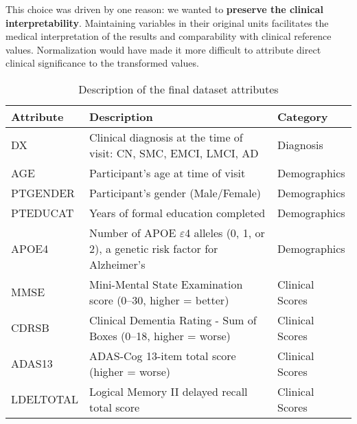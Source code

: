 This choice was driven by one reason: we wanted to \textbf{preserve the clinical interpretability}. Maintaining variables in their original units facilitates the medical interpretation of the results and comparability with clinical reference values. Normalization would have made it more difficult to attribute direct clinical significance to the transformed values.

\newpage

\begin{table}[H]
	\small
	\centering
	\caption{Description of the final dataset attributes}
	\label{tab:dataset-attributes}
	\begin{adjustbox}{max width=\textwidth}
		\begin{tabularx}{\textwidth}{>{\raggedright\arraybackslash}p{3cm} >{\raggedright\arraybackslash}X >{\raggedright\arraybackslash}p{3cm}}
			\toprule
			\textbf{Attribute} & \textbf{Description} & \textbf{Category} \\
			\midrule
			DX                    & Clinical diagnosis at the time of visit: CN, SMC, EMCI, LMCI, AD                   & Diagnosis             \\
			AGE                   & Participant’s age at time of visit                                                 & Demographics          \\
			PTGENDER              & Participant's gender (Male/Female)                                                 & Demographics          \\
			PTEDUCAT              & Years of formal education completed                                                & Demographics          \\
			APOE4                 & Number of APOE $\varepsilon$4 alleles (0, 1, or 2), a genetic risk factor for Alzheimer’s      & Demographics          \\
			MMSE                  & Mini-Mental State Examination score (0–30, higher = better)                        & Clinical Scores       \\
			CDRSB                 & Clinical Dementia Rating - Sum of Boxes (0–18, higher = worse)                     & Clinical Scores       \\
			ADAS13                & ADAS-Cog 13-item total score (higher = worse)                                      & Clinical Scores       \\
			LDELTOTAL             & Logical Memory II delayed recall total score                                       & Clinical Scores       \\

\end{tabularx}
\end{adjustbox}
\end{table}
